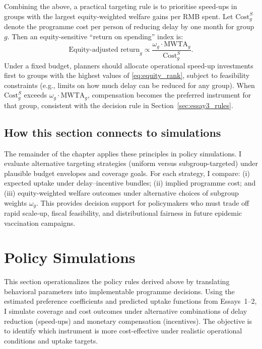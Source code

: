 \documentclass[doublespacing]{utdthesis}
\begin{document}
Combining the above, a practical targeting rule is to prioritise speed-ups in groups with the largest equity-weighted welfare gains per RMB spent. Let $\text{Cost}^{S}_g$ denote the programme cost per person of reducing delay by one month for group $g$. Then an equity-sensitive ``return on spending'' index is:
\begin{equation}
\text{Equity-adjusted return}_g \propto \frac{\omega_g \cdot \text{MWTA}_g}{\text{Cost}^{S}_g}.
\label{eq:equity_rank}
\end{equation}
Under a fixed budget, planners should allocate operational speed-up investments first to groups with the highest values of \eqref{eq:equity_rank}, subject to feasibility constraints (e.g., limits on how much delay can be reduced for any group). When $\text{Cost}^{S}_g$ exceeds $\omega_g \cdot \text{MWTA}_g$, compensation becomes the preferred instrument for that group, consistent with the decision rule in Section~\ref{sec:essay3_rules}.

\subsection{How this section connects to simulations}
\label{subsec:essay3_equity_to_sim}

The remainder of the chapter applies these principles in policy simulations. I evaluate alternative targeting strategies (uniform versus subgroup-targeted) under plausible budget envelopes and coverage goals. For each strategy, I compare: (i) expected uptake under delay--incentive bundles; (ii) implied programme cost; and (iii) equity-weighted welfare outcomes under alternative choices of subgroup weights $\omega_g$. This provides decision support for policymakers who must trade off rapid scale-up, fiscal feasibility, and distributional fairness in future epidemic vaccination campaigns.


\section{Policy Simulations}
\label{sec:essay3_sims}

This section operationalizes the policy rules derived above by translating behavioral parameters into implementable programme decisions. Using the estimated preference coefficients and predicted uptake functions from Essays~1--2, I simulate coverage and cost outcomes under alternative combinations of delay reduction (speed-ups) and monetary compensation (incentives). The objective is to identify which instrument is more cost-effective under realistic operational conditions and uptake targets.
\end{document}
